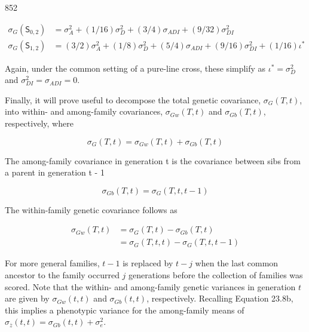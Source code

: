 \documentclass{article}
\begin{document}
852

\begin{equation}
\begin{aligned}\sigma_{G}(\mathsf{S}_{0,2})&=\sigma_{A}^{2}+(1/16)\sigma_{D}^{2}+(3/4)\sigma_{ADI}+(9/32)\sigma_{DI}^{2}\\\sigma_{G}(\mathsf{S}_{1,2})&=(3/2)\sigma_{A}^{2}+(1/8)\sigma_{D}^{2}+(5/4)\sigma_{ADI}+(9/16)\sigma_{DI}^{2}+(1/16)\iota^{*}\end{aligned}
\end{equation}

Again, under the common setting of a pure-line cross, these simplify as  $ \iota^* = \sigma_D^2 $ and  $ \sigma_{DI}^2 = \sigma_{ADI} = 0 $.

Finally, it will prove useful to decompose the total genetic covariance,  $ \sigma_G(T,t) $, into within- and among-family covariances,  $ \sigma_{Gw}(T,t) $ and  $ \sigma_{Gb}(T,t) $, respectively, where

\begin{equation}
\sigma_{G}(T,t)=\sigma_{G w}(T,t)+\sigma_{G b}(T,t)
\tag{23.37a}
\label{eq:23_37a}
\end{equation}

The among-family covariance in generation t is the covariance between sibs from a parent in generation t - 1

\begin{equation}
\sigma_{Gb}(T,t)=\sigma_{G}(T,t,t-1)
\tag{23.37b}
\label{eq:23_37b}
\end{equation}

The within-family genetic covariance follows as

\begin{equation}
\begin{aligned}\sigma_{Gw}(T,t)&=\sigma_{G}(T,t)-\sigma_{Gb}(T,t)\\&=\sigma_{G}(T,t,t)-\sigma_{G}(T,t,t-1)\end{aligned}
\tag{23.37c}
\label{eq:23_37c}
\end{equation}

For more general families,  $ t - 1 $ is replaced by  $ t - j $ when the last common ancestor to the family occurred  $ j $ generations before the collection of families was scored. Note that the within- and among-family genetic variances in generation  $ t $ are given by  $ \sigma_{Gw}(t, t) $ and  $ \sigma_{Gb}(t, t) $, respectively. Recalling Equation 23.8b, this implies a phenotypic variance for the among-family means of  $ \sigma_{\overline{z}}(t, t) = \sigma_{Gb}(t, t) + \sigma_{e}^2 $.
\end{document}
